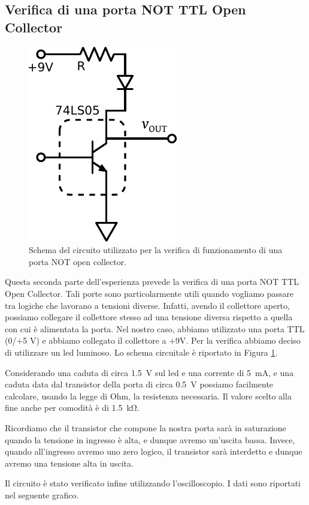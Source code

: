 \subsection{Verifica di una porta NOT TTL Open Collector }

\begin{figure}
\centering
\includegraphics[width=.2\textwidth]{../E10/latex/open_collector.pdf}
\caption{Schema del circuito utilizzato per la verifica di funzionamento di una porta NOT open collector.}
\label{cir10:open_collector}
\end{figure}

Questa seconda parte dell'esperienza prevede la verifica di una porta NOT TTL Open Collector.
Tali porte sono particolarmente utili quando vogliamo passare tra logiche che lavorano a tensioni diverse.
Infatti, avendo il collettore aperto, possiamo collegare il collettore stesso ad una tensione diversa rispetto a quella con cui è alimentata la porta.
Nel nostro caso, abbiamo utilizzato una porta TTL (0/+5 \si{\volt}) e abbiamo collegato il collettore a +9\si{\volt}.
Per la verifica abbiamo deciso di utilizzare un led luminoso.
Lo schema circuitale è riportato in Figura \ref{cir10:open_collector}.

Considerando una caduta di circa \SI{1.5}{\volt} sul led e una corrente di \SI{5}{\milli\ampere}, e una caduta data dal transistor della porta di circa \SI{0.5}{\volt} possiamo facilmente calcolare, usando la legge di Ohm, la resistenza necessaria.
Il valore scelto alla fine anche per comodità è di \SI{1.5}{\kilo\ohm}.

Ricordiamo che il transistor che compone la nostra porta sarà in saturazione quando la tensione in ingresso è alta, e dunque avremo un'uscita bassa.
Invece, quando all'ingresso avremo uno zero logico, il transistor sarà interdetto e dunque avremo una tensione alta in uscita.


Il circuito è stato verificato infine utilizzando l'oscilloscopio.
I dati sono riportati nel seguente grafico.

